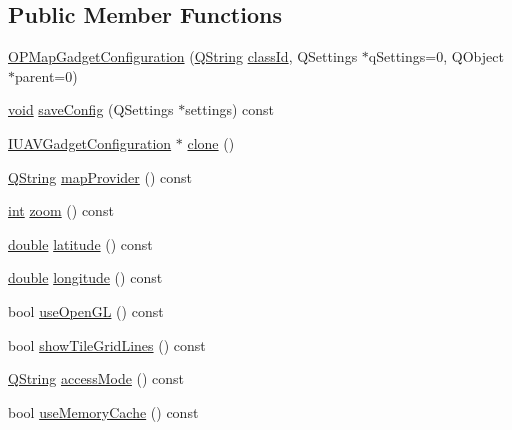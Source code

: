 \subsection*{Public Member Functions}
\begin{DoxyCompactItemize}
\item 
\hyperlink{group___o_p_map_plugin_gad087f5e0479a0571692363c3771744be}{O\-P\-Map\-Gadget\-Configuration} (\hyperlink{group___u_a_v_objects_plugin_gab9d252f49c333c94a72f97ce3105a32d}{Q\-String} \hyperlink{group___core_plugin_gac953657221ba7fda967ada0408332641}{class\-Id}, Q\-Settings $\ast$q\-Settings=0, Q\-Object $\ast$parent=0)
\item 
\hyperlink{group___u_a_v_objects_plugin_ga444cf2ff3f0ecbe028adce838d373f5c}{void} \hyperlink{group___o_p_map_plugin_ga6bbc8206c2e47f0a2fbee16ae3714fb1}{save\-Config} (Q\-Settings $\ast$settings) const 
\item 
\hyperlink{group___core_plugin_gacdfdf0b1e39b5002472b76b6564ce51f}{I\-U\-A\-V\-Gadget\-Configuration} $\ast$ \hyperlink{group___o_p_map_plugin_gad04d5a814a94033d32e4bbb42321c105}{clone} ()
\item 
\hyperlink{group___u_a_v_objects_plugin_gab9d252f49c333c94a72f97ce3105a32d}{Q\-String} \hyperlink{group___o_p_map_plugin_ga377c1d600009ec04bfa92e3a259c7071}{map\-Provider} () const 
\item 
\hyperlink{ioapi_8h_a787fa3cf048117ba7123753c1e74fcd6}{int} \hyperlink{group___o_p_map_plugin_ga0e5e3cbf297d14ff236edcf0ce5f4c8f}{zoom} () const 
\item 
\hyperlink{_super_l_u_support_8h_a8956b2b9f49bf918deed98379d159ca7}{double} \hyperlink{group___o_p_map_plugin_gaa2e49a8d2ff144343b4467f078374b0a}{latitude} () const 
\item 
\hyperlink{_super_l_u_support_8h_a8956b2b9f49bf918deed98379d159ca7}{double} \hyperlink{group___o_p_map_plugin_ga3faeb4ba6e69dd97e9f8451b35e47c7e}{longitude} () const 
\item 
bool \hyperlink{group___o_p_map_plugin_ga1b6fe88d155611b041e3e1e9213f1ab5}{use\-Open\-G\-L} () const 
\item 
bool \hyperlink{group___o_p_map_plugin_ga6bea5e6009e16f4a53c4e235dfd1594b}{show\-Tile\-Grid\-Lines} () const 
\item 
\hyperlink{group___u_a_v_objects_plugin_gab9d252f49c333c94a72f97ce3105a32d}{Q\-String} \hyperlink{group___o_p_map_plugin_ga2a0ae25b0c5f6fb24f2b2f791a9fe997}{access\-Mode} () const 
\item 
bool \hyperlink{group___o_p_map_plugin_gae363a6d1100a72e8a2089d08c192bb87}{use\-Memory\-Cache} () const 

\end{DoxyCompactItemize}
